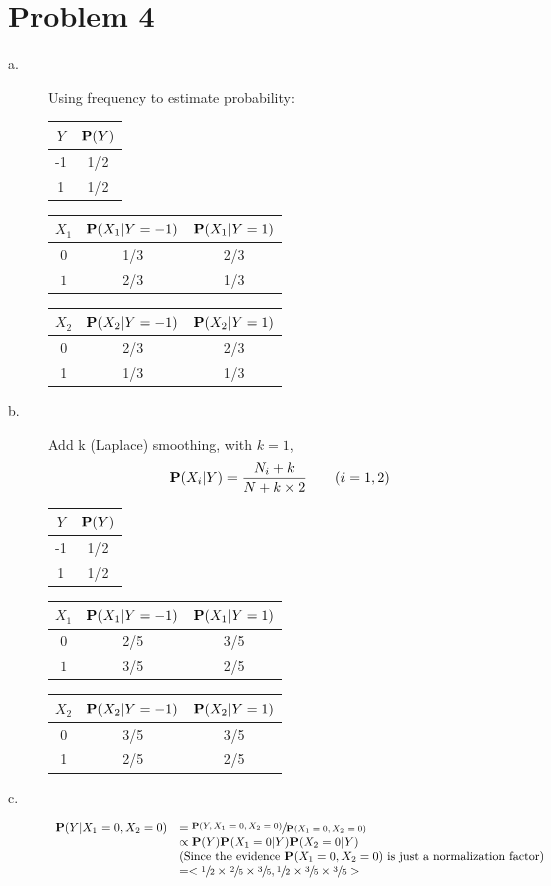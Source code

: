 \documentclass{mcmthesis}
\begin{document}
\section{Problem 4} 
\begin{description}
	\item[a.] Using frequency to estimate probability: 
	
	\begin{tabular}{c|c}
		$Y$ & $\mathbf{P}(Y)$ \\ \hline
		-1 & 1/2 \\
		1 & 1/2 
	\end{tabular}  \quad
	\begin{tabular}{c|cc} 
		$X_1$ & $\mathbf{P}(X_1|Y=-1)$ & $\mathbf{P}(X_1|Y= 1)$ \\  \hline
		$0$& 1/3 &2/3\\
		$1 $& 2/3&1/3
	\end{tabular} \quad 
	\begin{tabular}{c|cc}
		$X_2$&$\mathbf{P}(X_2|Y=-1)$ &$\mathbf{P}(X_2|Y= 1)$ \\ \hline 
		0&2/3&2/3\\
		1&1/3&1/3
	\end{tabular}
	\item[b.] Add k (Laplace) smoothing, with $k=1$, 
	$${\mathbf{P}(X_i|Y)}={\frac {N_{i}+k }{N+ k \times 2}}\qquad (i=1,2)$$
	\begin{tabular}{c|c}
		$Y$ & $\mathbf{P}(Y)$ \\ \hline
		-1 & 1/2 \\
		1 & 1/2 
	\end{tabular}  \quad
	\begin{tabular}{c|cc} 
		$X_1$ & $\mathbf{P}(X_1|Y=-1)$ & $\mathbf{P}(X_1|Y= 1)$ \\  \hline
		$0$& 2/5 &3/5\\
		$1 $& 3/5&2/5
	\end{tabular} \quad 
	\begin{tabular}{c|cc}
		$X_2$&$\mathbf{P}(X_2|Y=-1)$ &$\mathbf{P}(X_2|Y= 1)$ \\ \hline 
		0&3/5&3/5\\
		1&2/5&2/5
	\end{tabular}
	\item[c.] $$\begin{array}{ll}
	 \mathbf{P}(Y|X_1=0,X_2=0)& =\sfrac{\mathbf{P}(Y,X_1=0,X_2=0)}{\mathbf{P}(X_1=0,X_2=0)} \\
	& \propto \mathbf{P}(Y)\mathbf{P}(X_1=0|Y) \mathbf{P}(X_2=0|Y) \\ 
	 & (\text{Since the evidence $\mathbf{P}(X_1=0,X_2=0)$ is just a normalization factor} ) \\
	&=<\sfrac{1}{2}\times\sfrac{2}{5}\times\sfrac{3}{5},\sfrac{1}{2}\times\sfrac{3}{5}\times\sfrac{3}{5}> 
	\end{array}$$ 
	

\end{description}
\end{document}
